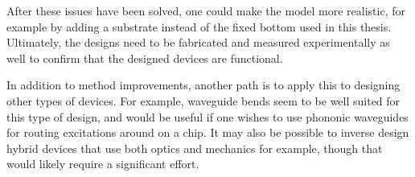 After these issues have been solved, one could make the model more realistic,
for example by adding a substrate instead of the fixed bottom used in this
thesis.
Ultimately, the designs need to be fabricated and measured experimentally as
well to confirm that the designed devices are functional.

In addition to method improvements, another path is to apply this to designing
other types of devices. For example, waveguide bends seem to be well suited for
this type of design, and would be useful if one wishes to use phononic
waveguides for routing excitations around on a chip. It may also be possible to
inverse design hybrid devices that use both optics and mechanics for example,
though that would likely require a significant effort.
